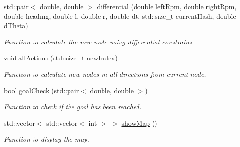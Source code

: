 \begin{DoxyCompactItemize}
std\+::pair$<$ double, double $>$ \hyperlink{classPathPlanner_a529920e695c8ae9a384a59138c3ae724}{differential} (double left\+Rpm, double right\+Rpm, double heading, double l, double r, double dt, std\+::size\+\_\+t current\+Hash, double d\+Theta)
\begin{DoxyCompactList}\small\item\em Function to calculate the new node using differential constrains. \end{DoxyCompactList}\item 
void \hyperlink{classPathPlanner_a7058d231726ba515e4b1d2cfa4f88e3c}{all\+Actions} (std\+::size\+\_\+t new\+Index)
\begin{DoxyCompactList}\small\item\em Function to calculate new nodes in all directions from current node. \end{DoxyCompactList}\item 
bool \hyperlink{classPathPlanner_a77e91065460a5ed65eab0df8c1362e74}{goal\+Check} (std\+::pair$<$ double, double $>$)
\begin{DoxyCompactList}\small\item\em Function to check if the goal has been reached. \end{DoxyCompactList}\item 
std\+::vector$<$ std\+::vector$<$ int $>$ $>$ \hyperlink{classPathPlanner_a485d7197e9c2bcfe4a99cafff8baeff7}{show\+Map} ()
\begin{DoxyCompactList}\small\item\em Function to display the map. \end{DoxyCompactList}\end{DoxyCompactItemize}
